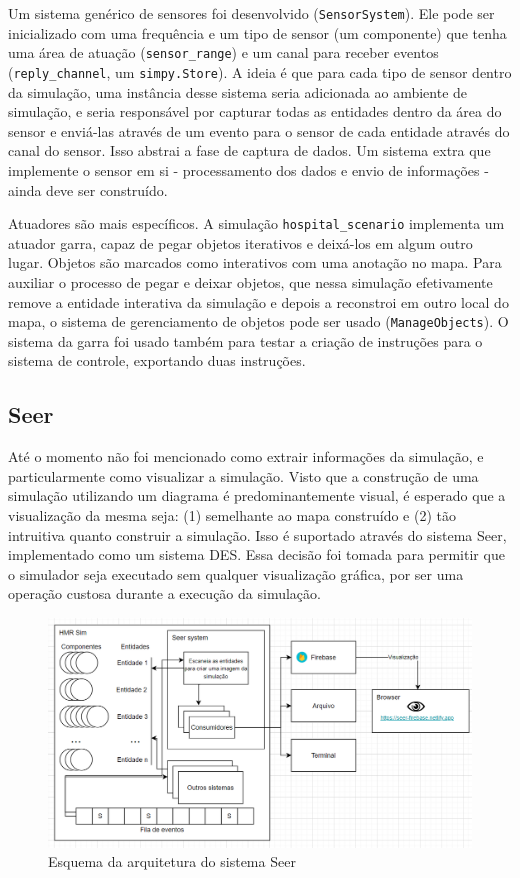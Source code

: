 Um sistema genérico de sensores foi desenvolvido (\texttt{SensorSystem}). Ele pode ser inicializado com uma frequência e um tipo de sensor (um componente) que tenha uma área de atuação (\texttt{sensor\_range}) e um canal para receber eventos (\texttt{reply\_channel}, um \texttt{simpy.Store}). A ideia é que para cada tipo de sensor dentro da simulação, uma instância desse sistema seria adicionada ao ambiente de simulação, e seria responsável por capturar todas as entidades dentro da área do sensor e enviá-las através de um evento para o sensor de cada entidade através do canal do sensor. Isso abstrai a fase de captura de dados. Um sistema extra que implemente o sensor em si - processamento dos dados e envio de informações - ainda deve ser construído.

Atuadores são mais específicos. A simulação \texttt{hospital\_scenario} implementa um atuador garra, capaz de pegar objetos iterativos e deixá-los em algum outro lugar. Objetos são marcados como interativos com uma anotação no mapa. Para auxiliar o processo de pegar e deixar objetos, que nessa simulação efetivamente remove a entidade interativa da simulação e depois a reconstroi em outro local do mapa, o sistema de gerenciamento de objetos pode ser usado (\texttt{ManageObjects}). O sistema da garra foi usado também para testar a criação de instruções para o sistema de controle, exportando duas instruções.

\subsection{Seer}
\label{sec:seer}

Até o momento não foi mencionado como extrair informações da simulação, e particularmente como visualizar a simulação. Visto que a construção de uma simulação utilizando um diagrama é predominantemente visual, é esperado que a visualização da mesma seja: (1) semelhante ao mapa construído e (2) tão intruitiva quanto construir a simulação. Isso é suportado através do sistema Seer, implementado como um sistema DES. Essa decisão foi tomada para permitir que o simulador seja executado sem qualquer visualização gráfica, por ser uma operação custosa durante a execução da simulação.

\begin{figure}[ht]
    \centering
    \includegraphics[width=\textwidth]{img/seer_architecture.png}
    \caption{Esquema da arquitetura do sistema Seer}
    \label{fig:seer_architecture}
\end{figure}

